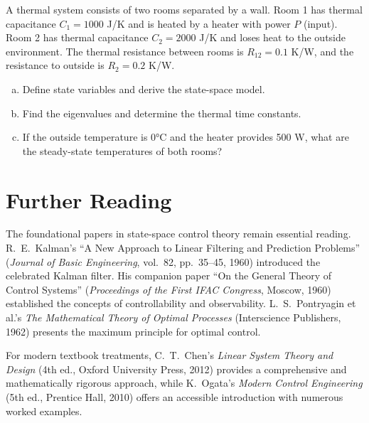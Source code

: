 \begin{exercise}
A thermal system consists of two rooms separated by a wall. Room 1 has thermal capacitance $C_1 = 1000$ J/K and is heated by a heater with power $P$ (input). Room 2 has thermal capacitance $C_2 = 2000$ J/K and loses heat to the outside environment. The thermal resistance between rooms is $R_{12} = 0.1$ K/W, and the resistance to outside is $R_2 = 0.2$ K/W.
\begin{enumerate}[(a)]
    \item Define state variables and derive the state-space model.
    \item Find the eigenvalues and determine the thermal time constants.
    \item If the outside temperature is 0°C and the heater provides 500 W, what are the steady-state temperatures of both rooms?
\end{enumerate}
\end{exercise}

\section*{Further Reading}

The foundational papers in state-space control theory remain essential reading. R.~E.~Kalman's ``A New Approach to Linear Filtering and Prediction Problems'' (\textit{Journal of Basic Engineering}, vol.~82, pp.~35--45, 1960) introduced the celebrated Kalman filter. His companion paper ``On the General Theory of Control Systems'' (\textit{Proceedings of the First IFAC Congress}, Moscow, 1960) established the concepts of controllability and observability. L.~S.~Pontryagin et al.'s \textit{The Mathematical Theory of Optimal Processes} (Interscience Publishers, 1962) presents the maximum principle for optimal control.

For modern textbook treatments, C.~T.~Chen's \textit{Linear System Theory and Design} (4th ed., Oxford University Press, 2012) provides a comprehensive and mathematically rigorous approach, while K.~Ogata's \textit{Modern Control Engineering} (5th ed., Prentice Hall, 2010) offers an accessible introduction with numerous worked examples.


